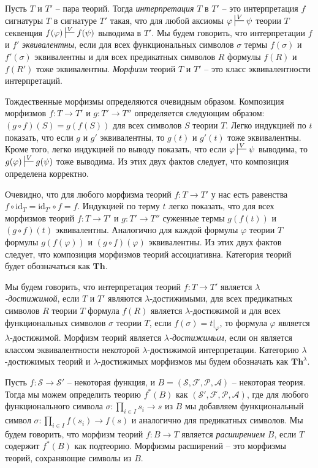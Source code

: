 \documentclass[reqno]{amsart}
\theoremstyle{definition}
\theoremstyle{remark}
\newcommand{\bcat}[1]{\mathbf{#1}}
\newcommand{\fs}[1]{\mathrm{#1}}
\newcommand{\Th}{\bcat{Th}}
\begin{document}
Пусть $T$ и $T'$ -- пара теорий.
Тогда \emph{интерпретация} $T$ в $T'$ -- это интерпретация $f$ сигнатуры $T$ в сигнатуре $T'$ такая,
что для любой аксиомы $\varphi \sststile{}{V} \psi$ теории $T$ секвенция $f(\varphi) \sststile{}{V} f(\psi)$ выводима в $T'$.
Мы будем говорить, что интерпретации $f$ и $f'$ \emph{эквивалентны}, если для всех функциональных символов $\sigma$ термы $f(\sigma)$ и $f'(\sigma)$ эквивалентны и для всех предикатных символов $R$ формулы $f(R)$ и $f(R')$ тоже эквивалентны.
\emph{Морфизм} теорий $T$ и $T'$ -- это класс эквивалентности интерпретаций.

Тождественные морфизмы определяются очевидным образом.
Композиция морфизмов $f : T \to T'$ и $g : T' \to T''$ определяется следующим образом: $(g \circ f)(S) = g(f(S))$ для всех символов $S$ теории $T$.
Легко индукцией по $t$ показать, что если $g$ и $g'$ эквивалентны, то $g(t)$ и $g'(t)$ тоже эквивалентны.
Кроме того, легко индукцией по выводу показать, что если $\varphi \sststile{}{V} \psi$ выводима, то $g(\varphi) \sststile{}{V} g(\psi)$ тоже выводима.
Из этих двух фактов следует, что композиция определена корректно.

Очевидно, что для любого морфизма теорий $f : T \to T'$ у нас есть равенства $f \circ \fs{id}_T = \fs{id}_{T'} \circ f = f$.
Индукцией по терму $t$ легко показать, что для всех морфизмов теорий $f : T \to T'$ и $g : T' \to T''$ суженные термы $g(f(t))$ и $(g \circ f)(t)$ эквивалентны.
Аналогично для каждой формулы $\varphi$ теории $T$ формулы $g(f(\varphi))$ и $(g \circ f)(\varphi)$ эквивалентны.
Из этих двух фактов следует, что композиция морфизмов теорий ассоциативна.
Категория теорий будет обозначаться как $\Th$.

Мы будем говорить, что интерпретация теорий $f : T \to T'$ является \emph{$\lambda$-достижимой}, если $T$ и $T'$ являются $\lambda$-достижимыми, для всех предикатных символов $R$ теории $T$ формула $f(R)$ является $\lambda$-достижимой
и для всех функциональных символов $\sigma$ теории $T$, если $f(\sigma) = t|_\varphi$, то формула $\varphi$ является $\lambda$-достижимой.
Морфизм теорий является \emph{$\lambda$-достижимым}, если он является классом эквивалентности некоторой $\lambda$-достижимой интерпретации.
Категорию $\lambda$-достижимых теорий и $\lambda$-достижимых морфизмов мы будем обозначать как $\Th^\lambda$.

Пусть $f : \mathcal{S} \to \mathcal{S}'$ -- некоторая функция, и $B = (\mathcal{S},\mathcal{F},\mathcal{P},\mathcal{A})$ -- некоторая теория.
Тогда мы можем определить теорию $f^*(B)$ как $(\mathcal{S}',\mathcal{F},\mathcal{P},\mathcal{A})$,
где для любого функционального символа $\sigma : \prod_{i \in I} s_i \to s$ из $B$ мы добавляем функциональный символ $\sigma : \prod_{i \in I} f(s_i) \to f(s)$ и аналогично для предикатных символов.
Мы будем говорить, что морфизм теорий $f : B \to T$ является \emph{расширением} $B$, если $T$ содержит $f^*(B)$ как подтеорию.
Морфизмы расширений -- это морфизмы теорий, сохраняющие символы из $B$.
\end{document}
